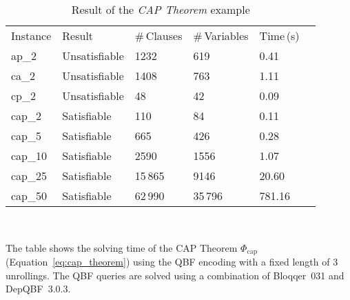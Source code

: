 \documentclass{LMCS}
\theoremstyle{plain}\newtheorem{theorem}[thm]{Theorem}
\theoremstyle{plain}\newtheorem{lemma}[thm]{Lemma}
\theoremstyle{plain}\newtheorem{proposition}[thm]{Proposition}
\theoremstyle{plain}\newtheorem{corollary}[thm]{Corollary}
\theoremstyle{definition}\newtheorem{definition}{Definition}[section]
\begin{document}
\begin{table}[b]
\caption[]{Result of the \emph{CAP Theorem} example}
\label{tbl:cap_theorem}
\centering
\begin{tabular}{llllll}
\hline\noalign{\smallskip}
Instance\hspace{10pt} & Result\hspace{40pt} & \#\,Clauses\hspace{10pt} & \#\,Variables\hspace{10pt} & Time\,(s) \\ \noalign{\smallskip}
\hline
\noalign{\smallskip}
ap\_2 & Unsatisfiable & 1232    & 619     & 0.41 \\
ca\_2 & Unsatisfiable & 1408    & 763     & 1.11 \\
cp\_2 & Unsatisfiable & 48      & 42      & 0.09 \\
cap\_2 & Satisfiable  & 110     & 84      & 0.11 \\
cap\_5 & Satisfiable  & 665     & 426     & 0.28 \\
cap\_10 & Satisfiable & 2590    & 1556    & 1.07 \\
cap\_25 & Satisfiable & 15\,865 & 9146    & 20.60 \\
cap\_50 & Satisfiable & 62\,990 & 35\,796 & 781.16 \\ \hline
\end{tabular}\\ {\smallskip}
\begin{minipage}[t]{0.74\textwidth}
{\small The table shows the solving time of the CAP Theorem $\Phi_\text{cap}$ (Equation~\ref{eq:cap_theorem}) using the QBF encoding with a fixed length of $3$ unrollings.
The QBF queries are solved using a combination of Bloqqer~031 and DepQBF~3.0.3.}
\end{minipage}
\end{table}
\end{document}
